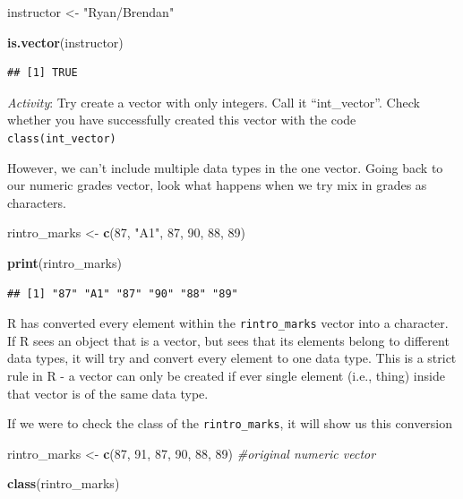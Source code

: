 \documentclass[
]{book}
\newenvironment{Shaded}{\begin{snugshade}}{\end{snugshade}}
\newcommand{\CommentTok}[1]{\textcolor[rgb]{0.56,0.35,0.01}{\textit{#1}}}
\newcommand{\DecValTok}[1]{\textcolor[rgb]{0.00,0.00,0.81}{#1}}
\newcommand{\FunctionTok}[1]{\textcolor[rgb]{0.13,0.29,0.53}{\textbf{#1}}}
\newcommand{\NormalTok}[1]{#1}
\newcommand{\OtherTok}[1]{\textcolor[rgb]{0.56,0.35,0.01}{#1}}
\newcommand{\StringTok}[1]{\textcolor[rgb]{0.31,0.60,0.02}{#1}}
\begin{document}
\begin{Shaded}
\begin{Highlighting}[]
\NormalTok{instructor }\OtherTok{\textless{}{-}} \StringTok{"Ryan/Brendan"}

\FunctionTok{is.vector}\NormalTok{(instructor)}
\end{Highlighting}
\end{Shaded}

\begin{verbatim}
## [1] TRUE
\end{verbatim}

\emph{Activity}: Try create a vector with only integers. Call it ``int\_vector''. Check whether you have successfully created this vector with the code \texttt{class(int\_vector)}

However, we can't include multiple data types in the one vector. Going back to our numeric grades vector, look what happens when we try mix in grades as characters.

\begin{Shaded}
\begin{Highlighting}[]
\NormalTok{rintro\_marks }\OtherTok{\textless{}{-}} \FunctionTok{c}\NormalTok{(}\DecValTok{87}\NormalTok{, }\StringTok{"A1"}\NormalTok{, }\DecValTok{87}\NormalTok{, }\DecValTok{90}\NormalTok{, }\DecValTok{88}\NormalTok{, }\DecValTok{89}\NormalTok{)}


\FunctionTok{print}\NormalTok{(rintro\_marks)}
\end{Highlighting}
\end{Shaded}

\begin{verbatim}
## [1] "87" "A1" "87" "90" "88" "89"
\end{verbatim}

R has converted every element within the \texttt{rintro\_marks} vector into a character. If R sees an object that is a vector, but sees that its elements belong to different data types, it will try and convert every element to one data type. This is a strict rule in R - a vector can only be created if ever single element (i.e., thing) inside that vector is of the same data type.

If we were to check the class of the \texttt{rintro\_marks}, it will show us this conversion

\begin{Shaded}
\begin{Highlighting}[]
\NormalTok{rintro\_marks }\OtherTok{\textless{}{-}} \FunctionTok{c}\NormalTok{(}\DecValTok{87}\NormalTok{, }\DecValTok{91}\NormalTok{, }\DecValTok{87}\NormalTok{, }\DecValTok{90}\NormalTok{, }\DecValTok{88}\NormalTok{, }\DecValTok{89}\NormalTok{) }\CommentTok{\#original numeric vector}


\FunctionTok{class}\NormalTok{(rintro\_marks)}
\end{Highlighting}
\end{Shaded}
\end{document}
